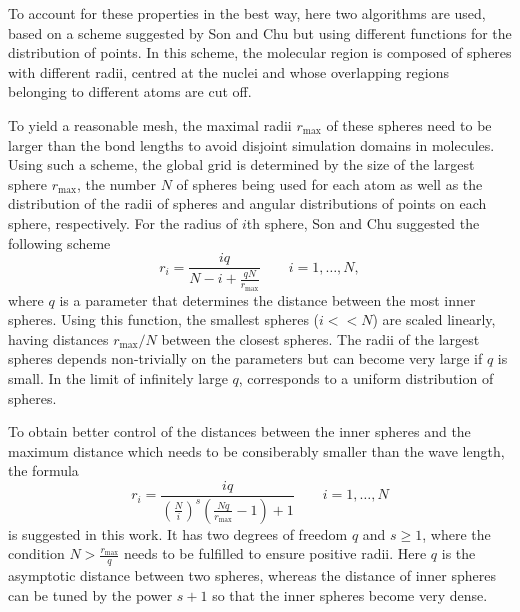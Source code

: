 To account for these properties in the best way, here two algorithms are used, based on a scheme suggested by Son and Chu \cite{Son_Chu} but using different functions for the distribution of points.
In this scheme, the molecular region is composed of spheres with different radii, centred at the nuclei and whose overlapping regions belonging to different atoms are cut off.

To yield a reasonable mesh, the maximal radii $r_\text{max}$ of these spheres need to be larger than the bond lengths to avoid disjoint simulation domains in molecules.
Using such a scheme, the global grid is determined by the size of the largest sphere $r_\text{max}$, the number $N$ of spheres being used for each atom as well as the distribution of the radii of spheres and angular distributions of points on each sphere, respectively.
For the radius of $i$th sphere, Son and Chu \cite{Son_Chu0} suggested the following scheme
\begin{equation} \label{eq:son_map}
r_i=\frac{iq}{N-i+\frac{qN}{r_\text{max}}} \qquad i=1,\hdots ,N,
\end{equation}
where $q$ is a parameter that determines the distance between the most inner spheres.
Using this function, the smallest spheres ($i<<N$) are scaled linearly, having distances $r_\text{max}/N$ between the closest spheres.
The radii of the largest spheres depends non-trivially on the parameters but can become very large if $q$ is small.
In the limit of infinitely large $q$,  corresponds to a uniform distribution of spheres.

To obtain better control of the distances between the inner spheres and the maximum distance which needs to be consiberably smaller than the wave length, the formula
\begin{equation} \label{eq:tm_map}
r_i=\frac{iq}{\left( \frac Ni \right)^s \left(\frac{Nq}{r_\text{max}}-1\right) +1} \qquad i=1,\hdots ,N 
\end{equation}
is suggested in this work.
It has two degrees of freedom $q$ and $s\geq 1$, where the condition $N>\frac{r_\text{max}}{q}$ needs to be fulfilled to ensure positive radii.
Here $q$ is the asymptotic distance between two spheres, whereas the distance of inner spheres can be tuned by the power $s+1$ so that the inner spheres become very dense.

